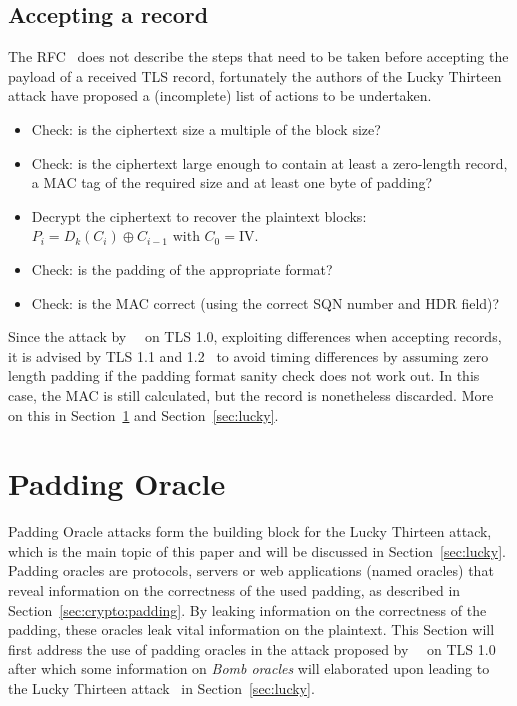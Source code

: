 \documentclass[10pt,conference,a4paper]{IEEEtran}
\begin{document}
\subsection{Accepting a record}
\label{sec:tls:accepting}
The RFC~\cite{ietf2008transport} does not describe the steps that need to be taken before accepting the payload of a received TLS record, fortunately the authors of the Lucky Thirteen attack have proposed a (incomplete) list of actions to be undertaken.
\begin{itemize}
  \item Check: is the ciphertext size a multiple of the block size?
  \item Check: is the ciphertext large enough to contain at least a zero-length record, a MAC tag of the required size and at least one byte of padding?
  \item Decrypt the ciphertext to recover the plaintext blocks: $P_i = D_k(C_i) \oplus C_{i-1} \text{ with } C_0 = \text{IV}$.
  \item Check: is the padding of the appropriate format?
  \item Check: is the MAC correct (using the correct SQN number and HDR field)?
\end{itemize}
Since the attack by~\citeauthor{vaudenay2002security}~\cite{vaudenay2002security} on TLS 1.0, exploiting differences when accepting records, it is advised by TLS 1.1 and 1.2~\cite{ietf2008transport} to avoid timing differences by assuming zero length padding if the padding format sanity check does not work out. In this case, the MAC is still calculated, but the record is nonetheless discarded. More on this in Section~\ref{sec:paddingoracle} and Section~\ref{sec:lucky}.



\section{Padding Oracle}
\label{sec:paddingoracle}
Padding Oracle attacks form the building block for the Lucky Thirteen attack, which is the main topic of this paper and will be discussed in Section~\ref{sec:lucky}. Padding oracles are protocols, servers or web applications (named oracles) that reveal information on the correctness of the used padding, as described in Section~\ref{sec:crypto:padding}. By leaking information on the correctness of the padding, these oracles leak vital information on the plaintext. This Section will first address the use of padding oracles in the attack proposed by~\citeauthor{vaudenay2002security}~\cite{vaudenay2002security} on TLS 1.0~\cite{dierks1999rfc} after which some information on \textit{Bomb oracles} will elaborated upon leading to the Lucky Thirteen attack~\cite{alfardan2013lucky} in Section~\ref{sec:lucky}.
\end{document}
